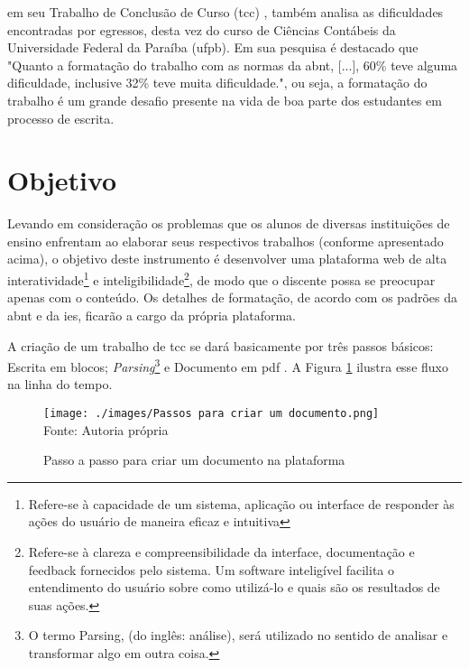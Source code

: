 \clearpage

\cite{santos}
em seu Trabalho de Conclusão de Curso
(\acrshort{tcc})
, também analisa as
dificuldades encontradas por egressos, desta vez do curso de Ciências Contábeis da
Universidade Federal da Paraíba
(\acrshort{ufpb}).
Em sua pesquisa é destacado que "Quanto a
formatação do trabalho com as normas da 
\acrshort{abnt}, {[}...{]}, 60\% teve alguma dificuldade, inclusive
32\% teve muita dificuldade.", ou seja, a formatação do trabalho é um grande desafio presente
na vida de boa parte dos estudantes em processo de escrita.

\section{Objetivo}

Levando em consideração os problemas que os alunos de diversas instituições de ensino enfrentam ao elaborar seus respectivos
trabalhos (conforme apresentado acima), o objetivo deste instrumento é desenvolver uma plataforma web de alta
interatividade\footnote{Refere-se à capacidade de um sistema, aplicação ou interface de responder
        às ações do usuário de maneira eficaz e intuitiva}
e
inteligibilidade\footnote{Refere-se à clareza e compreensibilidade da interface, documentação e feedback fornecidos pelo
    sistema. Um software inteligível facilita o entendimento do usuário sobre como utilizá-lo e quais são os resultados de suas ações.},
de modo que o discente possa se preocupar apenas com o conteúdo. Os detalhes de formatação, de acordo com os padrões da
\acrshort{abnt}
e da
\acrshort{ies},
ficarão a cargo da própria plataforma.

A criação de um trabalho de
\acrshort{tcc}
se dará basicamente por três passos básicos: Escrita em blocos;
\textit{Parsing}\footnote{O termo Parsing, (do inglês: análise), será utilizado no
sentido de analisar e transformar algo em outra coisa.}
e
Documento em
\acrshort{pdf}
. A Figura \ref{fig:Passos para criar um documento} ilustra esse fluxo na linha do tempo.

\begin{figure}[H]
    \centering
    \caption{Passo a passo para criar um documento na plataforma}
    \texttt{[image: ./images/Passos para criar um documento.png]}
    \label{fig:Passos para criar um documento} \\
    \textnormal{\fontsize{10pt}{12pt}Fonte: Autoria própria}
\end{figure}


